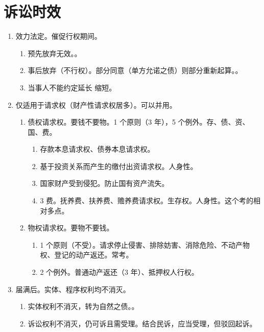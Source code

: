 \section{诉讼时效}
\begin{enumerate}
  \item 效力法定。催促行权期间。
        \begin{enumerate}
          \item 预先放弃无效。。
          \item 事后放弃（\ydy 不行权）。部分同意（单方允诺之债）则部分重新起算。。
          \item 当事人不能约定延长 \hz 缩短。
        \end{enumerate}
  \item 仅适用于请求权（财产性请求权居多）。可以并用。
        \begin{enumerate}
          \item 债权请求权。要钱不要物。1 个原则（3 年），5 个例外。存、债、资、国、费。
                \begin{enumerate}
                  \item 存款本息请求权、债券本息请求权。
                  \item 基于投资关系而产生的缴付出资请求权。人身性。
                  \item 国家财产受到侵犯。防止国有资产流失。
                  \item 3 费。抚养费、扶养费、赡养费请求权。生存权。人身性。这个考的相对多点。
                \end{enumerate}
          \item 物权请求权。要物不要钱。
                \begin{enumerate}
                  \item 1 个原则（不受）。请求停止侵害、排除妨害、消除危险、不动产物权、登记的动产返还。常考。
                  \item 2 个例外。普通动产返还（3 年）、抵押权人行权。
                \end{enumerate}
        \end{enumerate}
  \item 届满后。实体、程序权利均不消灭。
        \begin{enumerate}
          \item 实体权利不消灭，转为自然之债。。
          \item 诉讼权利不消灭，仍可诉且需受理。结合民诉，应当受理，但驳回起诉。

\end{enumerate}
\end{enumerate}
